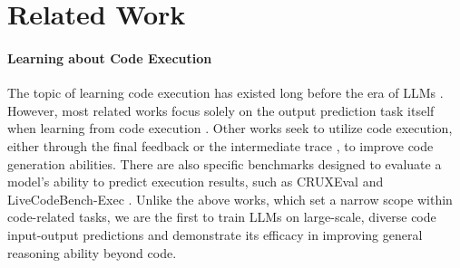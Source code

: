 \section{Related Work}
\label{sec:related_work}

\paragraph{Learning about Code Execution}
The topic of learning code execution has existed long before the era of LLMs \cite{zaremba2014learning, graves2014neural}. However, most related works focus solely on the output prediction task itself when learning from code execution \cite{nye2021show, liu2023code, ding2024traced}. Other works seek to utilize code execution, either through the final feedback \cite{ding2024cycle, wang2024leti} or the intermediate trace \cite{ding2024semcoder, ni2024next}, to improve code generation abilities. There are also specific benchmarks designed to evaluate a model's ability to predict execution results, such as CRUXEval \cite{gu2024cruxeval} and LiveCodeBench-Exec \cite{jain2024livecodebench}. Unlike the above works, which set a narrow scope within code-related tasks, we are the first to train LLMs on large-scale, diverse code input-output predictions and demonstrate its efficacy in improving general reasoning ability beyond code.

